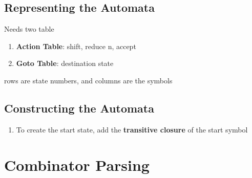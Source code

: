   \subsection{Representing the Automata}

    Needs two table

    \begin{enumerate}
      \item \textbf{Action Table}: shift, reduce n, accept
      \item \textbf{Goto Table}: destination state
    \end{enumerate}

    rows are state numbers, and columns are the symbols

  \subsection{Constructing the Automata}

    \begin{enumerate}
      \item To create the start state, add the \textbf{transitive closure}
      of the start symbol
    \end{enumerate}

\section{Combinator Parsing}
